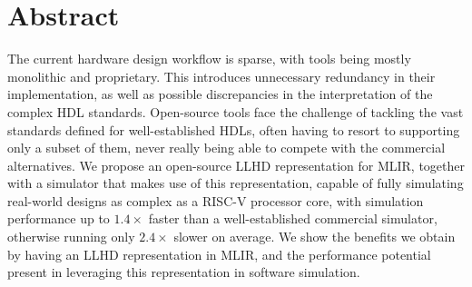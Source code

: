 


\begingroup
\let\clearpage\relax
\let\cleardoublepage\relax
\let\cleardoublepage\relax

\chapter*{Abstract}
The current hardware design workflow is sparse, with tools being mostly monolithic and proprietary. This introduces unnecessary redundancy in their implementation, as well as possible discrepancies in the interpretation of the complex HDL standards.
Open-source tools face the challenge of tackling the vast standards defined for well-established HDLs, often having to resort to supporting only a subset of them, never really being able to compete with the commercial alternatives.
We propose an open-source LLHD representation for MLIR, together with a simulator that makes use of this representation, capable of fully simulating real-world designs as complex as a RISC-V processor core, with simulation performance up to $1.4\times$ faster than a well-established commercial simulator, otherwise running only $2.4\times$ slower on average.
We show the benefits we obtain by having an LLHD representation in MLIR, and the performance potential present in leveraging this representation in software simulation.

\endgroup

\vfill